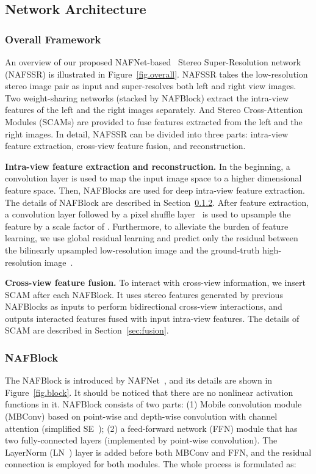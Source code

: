 \documentclass[10pt,twocolumn,letterpaper]{article}
\begin{document}
\subsection{Network Architecture}\label{sec:arch}
\subsubsection{Overall Framework}
An overview of our proposed NAFNet-based~\cite{chen2022simple} Stereo Super-Resolution network (NAFSSR) is illustrated in Figure~\ref{fig.overall}. NAFSSR takes the low-resolution stereo image pair as input and super-resolves both left and right view images.
Two weight-sharing networks (stacked by NAFBlock) extract the intra-view features of the left and the right images separately. And Stereo Cross-Attention Modules (SCAMs) are provided to fuse features extracted from the left and the right images. 
In detail, NAFSSR can be divided into three parts: intra-view feature extraction, cross-view feature fusion, and reconstruction.

\textbf{Intra-view feature extraction and reconstruction.}
In the beginning, a  convolution layer is used to map the input image space to a higher dimensional feature space. Then,  NAFBlocks are used for deep intra-view feature extraction. The details of NAFBlock are described in Section~\ref{sec:NAFBlock}.
After feature extraction, a  convolution layer followed by a pixel shuffle layer~\cite{shi2016real} is used to upsample the feature by a scale factor of . 
Furthermore, to alleviate the burden of feature learning, we use global residual learning and predict only the residual between the bilinearly upsampled low-resolution image and the ground-truth high-resolution image~\cite{liang2022vrt}. 

\textbf{Cross-view feature fusion.}
To interact with cross-view information, we insert SCAM after each NAFBlock.
It uses stereo features generated by previous NAFBlocks as inputs to perform bidirectional cross-view interactions, and outputs interacted features fused with input intra-view features. 
The details of SCAM are described in Section~\ref{sec:fusion}.



\subsubsection{NAFBlock}\label{sec:NAFBlock}
The NAFBlock is introduced by NAFNet~\cite{chen2022simple}, and its details are shown in Figure~\ref{fig.block}. It should be noticed that there are no nonlinear activation functions in it. 
NAFBlock consists of two parts: (1) Mobile convolution module (MBConv) based on point-wise and depth-wise convolution with channel attention (simplified SE~\cite{hu2018squeeze}); (2) a feed-forward network (FFN) module that has two fully-connected layers (implemented by point-wise convolution). The LayerNorm (LN~\cite{ba2016layer}) layer is added before both MBConv and FFN, and the residual connection is employed for both modules. The whole process is formulated as:
\end{document}
